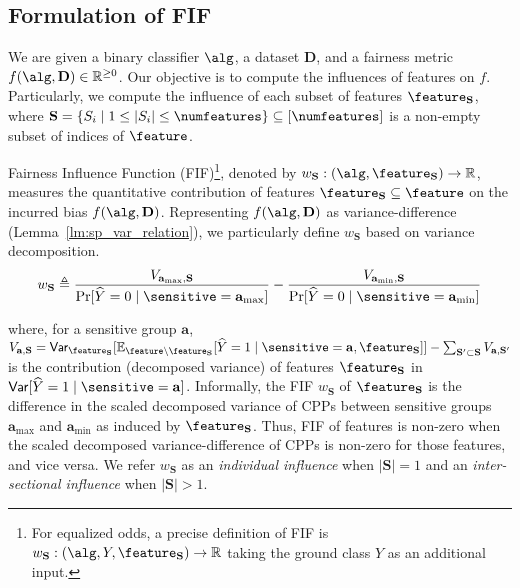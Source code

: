 \subsection{Formulation of FIF}
\label{sec:fif_formulation}
We are given a binary classifier  $\alg $, a dataset $ \mathbf{D} $, and a  fairness metric $ f(\alg, \mathbf{D}) \in \mathbb{R}^{\geq 0} $. Our objective is to compute the influences of  features on $ f $. Particularly, we compute the influence of each subset of  features $ \feature_{\mathbf{S}} $, where $ \mathbf{S} = \{S_i \mid 1 \le |S_i| \le \numfeatures\} \subseteq [\numfeatures]  $ is a non-empty subset of indices of $ \feature $.

\begin{definition} Fairness Influence Function (FIF)\footnote{For equalized odds, a precise definition of FIF is $ w_{\mathbf{S}}: (\alg, Y, \feature_{\mathbf{S}}) \rightarrow \mathbb{R} $ taking the ground class $ Y $ as an additional input.}, denoted by $ w_{\mathbf{S}}: (\alg, \feature_{\mathbf{S}}) \rightarrow \mathbb{R} $, measures the quantitative contribution of features $ \feature_{\mathbf{S}} \subseteq \feature $ on the incurred bias $ f(\alg, \mathbf{D}) $. Representing $ f(\alg, \mathbf{D}) $ as variance-difference (Lemma~\ref{lm:sp_var_relation}), we particularly define $ w_{\mathbf{S}} $ based on variance decomposition.
\begin{equation}\label{eq:fif_decompose}
	w_{\mathbf{S}}  \triangleq \frac{V_{\mathbf{a}_{\max}, \mathbf{S}}}{ \Pr[\widehat{Y} = 0 \mid  \sensitive = \mathbf{a}_{\max}]} - \frac{V_{\mathbf{a}_{\min}, \mathbf{S}} }{\Pr[\widehat{Y} = 0 \mid  \sensitive = \mathbf{a}_{\min}]}
\end{equation}

where, for a sensitive group $ \mathbf{a} $, $ V_{\mathbf{a}, \mathbf{S}} =  \mathsf{Var} _{\feature_{\mathbf{S}}}[\mathbb{E}_{\feature\setminus\feature_{\mathbf{S}}}[\widehat{Y} = 1\mid \sensitive = \mathbf{a}, \feature_{\mathbf{S}}]]- \sum_{\mathbf{S}' \subset \mathbf{S}}{V} _{\mathbf{a}, \mathbf{S}'} $ is the contribution (decomposed variance) of features $ \feature_{\mathbf{S}} $ in $ \mathsf{Var}[\widehat{Y} = 1\mid\sensitive = \mathbf{a}] $. Informally, the FIF $ w_{\mathbf{S}} $ of $ \feature_{\mathbf{S}} $ is the difference in the scaled decomposed variance of CPPs between sensitive groups $ \mathbf{a}_{\max} $ and $ \mathbf{a}_{\min} $ as induced by  $ \feature_{\mathbf{S}} $. Thus, FIF of features is non-zero when the scaled decomposed variance-difference of CPPs is non-zero for those features, and vice versa. We refer $ w_{\mathbf{S}} $ as an \emph{individual influence} when $ |\mathbf{S}| = 1 $ and an \emph{inter-sectional influence} when $ |\mathbf{S}| > 1 $.
 
\end{definition}	

